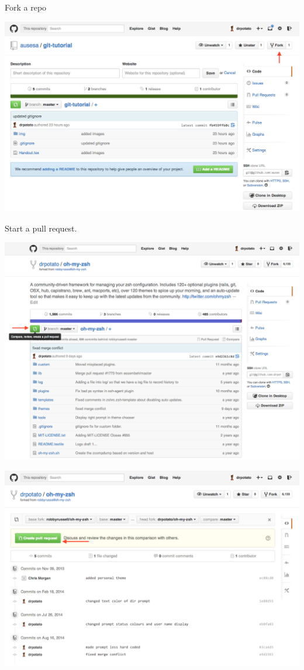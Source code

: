 \documentclass{tufte-handout}
\begin{document}
Fork a repo

\includegraphics[scale=0.4]{img/github-fork.png}

\pagebreak
Start a pull request.

\includegraphics[scale=0.4]{img/github-start-pull-request.png}

\includegraphics[scale=0.4]{img/github-finish-pull-request.png}
\end{document}
